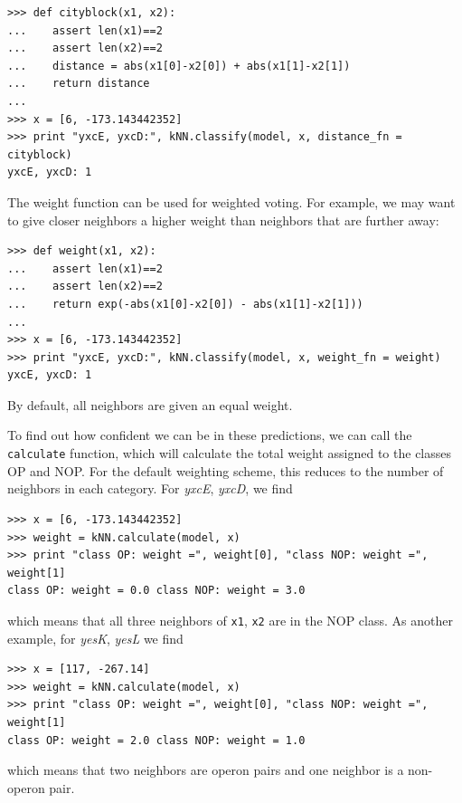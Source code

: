 \documentclass{report}
\begin{document}
\begin{verbatim}
>>> def cityblock(x1, x2):
...    assert len(x1)==2
...    assert len(x2)==2
...    distance = abs(x1[0]-x2[0]) + abs(x1[1]-x2[1])
...    return distance
...
>>> x = [6, -173.143442352]
>>> print "yxcE, yxcD:", kNN.classify(model, x, distance_fn = cityblock)
yxcE, yxcD: 1
\end{verbatim}

The weight function can be used for weighted voting. For example, we may want to give closer neighbors a higher weight than neighbors that are further away:

\begin{verbatim}
>>> def weight(x1, x2):
...    assert len(x1)==2
...    assert len(x2)==2
...    return exp(-abs(x1[0]-x2[0]) - abs(x1[1]-x2[1]))
...
>>> x = [6, -173.143442352]
>>> print "yxcE, yxcD:", kNN.classify(model, x, weight_fn = weight)
yxcE, yxcD: 1
\end{verbatim}
By default, all neighbors are given an equal weight.

To find out how confident we can be in these predictions, we can call the \verb+calculate+ function, which will calculate the total weight assigned to the classes OP and NOP. For the default weighting scheme, this reduces to the number of neighbors in each category. For {\it yxcE}, {\it yxcD}, we find
\begin{verbatim}
>>> x = [6, -173.143442352]
>>> weight = kNN.calculate(model, x)
>>> print "class OP: weight =", weight[0], "class NOP: weight =", weight[1]
class OP: weight = 0.0 class NOP: weight = 3.0
\end{verbatim}
which means that all three neighbors of \verb+x1+, \verb+x2+ are in the NOP class. As another example, for {\it yesK}, {\it yesL} we find

\begin{verbatim}
>>> x = [117, -267.14]
>>> weight = kNN.calculate(model, x)
>>> print "class OP: weight =", weight[0], "class NOP: weight =", weight[1]
class OP: weight = 2.0 class NOP: weight = 1.0
\end{verbatim}
which means that two neighbors are operon pairs and one neighbor is a non-operon pair.
\end{document}
